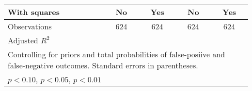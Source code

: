{\begin{tabular}{l*{4}{c}}
With squares    &       No         &      Yes         &       No         &      Yes         \\
\hline
Observations    &      624         &      624         &      624         &      624         \\
Adjusted \(R^{2}\)&                  &                  &                  &                  \\
\hline\hline
\multicolumn{5}{l}{\footnotesize Controlling for priors and total probabilities of false-posiive and false-negative outcomes. Standard errors in parentheses.}\\
\multicolumn{5}{l}{\footnotesize \sym{*} \(p<0.10\), \sym{**} \(p<0.05\), \sym{***} \(p<0.01\)}\\
\end{tabular}
}
